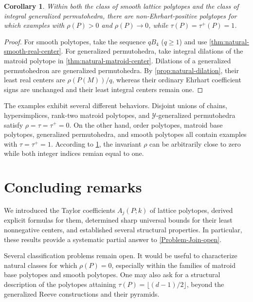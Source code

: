 \documentclass[reqno, 12pt]{article}
\numberwithin{equation}{section}
\newtheorem{corollary}[theorem]{Corollary}
\theoremstyle{definition}
\begin{document}
\begin{corollary}\label{cor:natural-no-real-gap}
Within both the class of smooth lattice polytopes and the class of integral generalized permutohedra, there are non-Ehrhart-positive polytopes for which examples with $\rho(P)>0$ and $\rho(P)\rightarrow 0$, while $\tau(P)=\tau^+(P)=1$.
\end{corollary}
\begin{proof}
For smooth polytopes, take the sequence $qB_4$ ($q\geq 1$) and use \cref{thm:natural-smooth-real-center}.  For generalized
permutohedra, take integral dilations of the matroid polytope in \cref{thm:natural-matroid-center}.  Dilations of a generalized
permutohedron are generalized permutohedra.  By \cref{prop:natural-dilation}, their least real centers are $\rho(P(M))/q$,
whereas their ordinary Ehrhart coefficient signs are unchanged and their least integral centers remain one.
\end{proof}


The examples exhibit several different behaviors.  Disjoint unions of chains, hypersimplices, rank-two matroid polytopes, and
$\mathcal Y$-generalized permutohedra satisfy $\rho=\tau=\tau^+=0$.  On the other hand, order polytopes, matroid base polytopes, generalized permutohedra, and smooth polytopes all contain examples with $\tau=\tau^+=1$. 
According to \cref{cor:natural-no-real-gap}, the invariant $\rho$ can be arbitrarily close to zero while both integer indices remian equal to one.




\section{Concluding remarks}\label{sec:conclusion}

We introduced the Taylor coefficients $A_j(P; k)$ of lattice polytopes, derived explicit formulas for them, determined sharp universal bounds for their least nonnegative centers, and established several structural properties. In particular, these results provide a systematic partial answer to \cref{Problem-Join-open}. 

Several classification problems remain open.  It would be useful to characterize natural classes for which $\rho(P)=0$, especially within the families of matroid base polytopes and smooth polytopes.  One may also ask for a structural description of the polytopes attaining $\tau(P)=\lfloor(d-1)/2\rfloor$, beyond the generalized Reeve constructions and their pyramids. 
\end{document}

